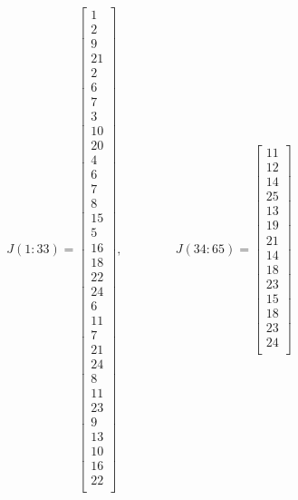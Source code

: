 \documentclass[12pt]{article}
\begin{document}
\begin{itemize}
\begin{small}
$$J(1:33)=\begin{bmatrix}
	1\\
     2\\
     9\\
    21\\
     2\\
     6\\
     7\\
     3\\
    10\\
    20\\
     4\\
     6\\
     7\\
     8\\
    15\\
     5\\
    16\\
    18\\
    22\\
    24\\
     6\\
    11\\
     7\\
    21\\
    24\\
     8\\
    11\\
    23\\
     9\\
    13\\
    10\\
    16\\
    22\\
    \end{bmatrix},\hspace{50pt}
    J(34:65)=\begin{bmatrix}
    11\\
    12\\
    14\\
    25\\
    13\\
    19\\
    21\\
    14\\
    18\\
    23\\
    15\\
    18\\
    23\\
    24\\

\end{bmatrix}$$
\end{small}
\end{itemize}
\end{document}
